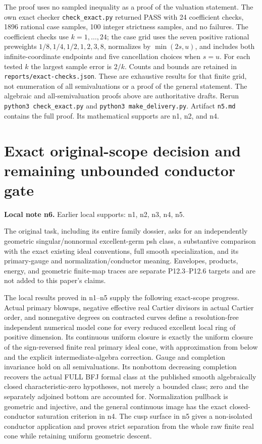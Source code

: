 \documentclass[11pt]{article}
\begin{document}
The proof uses no sampled inequality as a proof of the valuation statement. The own exact checker \texttt{check\_\allowbreak{}exact.\allowbreak{}py} returned PASS with 24 coefficient checks, 1896 rational case samples, 100 integer strictness samples, and no failures. The coefficient checks use $k=1,\ldots,24$; the case grid uses the seven positive rational preweights $1/8,1/4,1/2,1,2,3,8$, normalizes by $\min(2s,u)$, and includes both infinite-coordinate endpoints and five cancellation choices when $s=u$. For each tested $k$ the largest sample error is $2/k$. Counts and bounds are retained in \texttt{reports/\allowbreak{}exact-\allowbreak{}checks.\allowbreak{}json}. These are exhaustive results for that finite grid, not enumeration of all semivaluations or a proof of the general statement. The algebraic and all-semivaluation proofs above are authoritative drafts. Rerun \texttt{python3 check\_\allowbreak{}exact.\allowbreak{}py} and \texttt{python3 make\_\allowbreak{}delivery.\allowbreak{}py}. Artifact \texttt{n5.\allowbreak{}md} contains the full proof. Its mathematical supports are n1, n2, and n4.

\section{Exact original-scope decision and remaining unbounded conductor gate}
\label{sec:n6}
\noindent\textbf{Local note n6.} Earlier local supports: n1, n2, n3, n4, n5.

The original task, including its entire family dossier, asks for an independently geometric singular/nonnormal excellent-germ psh class, a substantive comparison with the exact existing ideal conventions, full smooth specialization, and its primary-gauge and normalization/conductor meaning. Envelopes, products, energy, and geometric finite-map traces are separate P12.3--P12.6 targets and are not added to this paper's claims.

The local results proved in n1--n5 supply the following exact-scope progress. Actual primary blowups, negative effective real Cartier divisors in actual Cartier order, and nonnegative degrees on contracted curves define a resolution-free independent numerical model cone for every reduced excellent local ring of positive dimension. Its continuous uniform closure is exactly the uniform closure of the sign-reversed finite real primary ideal cone, with approximation from below and the explicit intermediate-algebra correction. Gauge and completion invariance hold on all semivaluations. Its nonbottom decreasing completion recovers the actual FULL BFJ formal class at the published smooth algebraically closed characteristic-zero hypotheses, not merely a bounded class; zero and the separately adjoined bottom are accounted for. Normalization pullback is geometric and injective, and the general continuous image has the exact closed-conductor saturation criterion in n4. The cusp surface in n5 gives a non-isolated conductor application and proves strict separation from the whole raw finite real cone while retaining uniform geometric descent.
\end{document}
